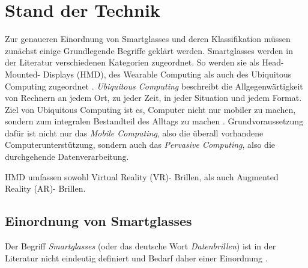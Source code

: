 %
%
%
%
%
%
\chapter{Stand der Technik}
\label{sec:Stand_der_Technik}
Zur genaueren Einordnung von Smartglasses und deren Klassifikation müssen zunächst einige Grundlegende Begriffe geklärt werden. Smartglasses werden in der Literatur verschiedenen Kategorien zugeordnet. So werden sie als Head-Mounted- Displays (HMD), des Wearable Computing als auch des Ubiquitous Computing zugeordnet \cite[S.~20]{ThomasDirkMetzgerHelmutNiegemannHrsg2018}. \emph{Ubiquitous Computing} beschreibt die Allgegenwärtigkeit von Rechnern an jedem Ort, zu jeder Zeit, in jeder Situation und jedem Format. Ziel von Ubiquitous Computing ist es, Computer nicht nur mobiler zu machen, sondern zum integralen Bestandteil des Alltags zu machen \cite[S.~24]{Schwenke2016}. Grundvoraussetzung dafür ist nicht nur das \emph{Mobile Computing}, also die überall vorhandene Computerunterstützung, sondern auch das \emph{Pervasive Computing}, also die durchgehende Datenverarbeitung. 

HMD umfassen sowohl Virtual Reality (VR)- Brillen, als auch Augmented Reality (AR)- Brillen.
%
%
%
%
%
%
\section{Einordnung von Smartglasses}
\label{sec:Einordnung_von_Smartglasses}
Der Begriff \emph{Smartglasses} (oder das deutsche Wort \emph{Datenbrillen}) ist in der Literatur nicht eindeutig definiert und Bedarf daher einer Einordnung \cite[S.~26]{Schwenke2016}.

